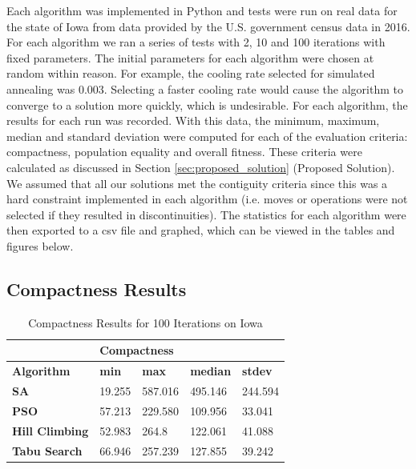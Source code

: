 \documentclass[journal]{IEEEtran}
\begin{document}
Each algorithm was implemented in Python and tests were run on real data for the state of Iowa from data provided by the U.S. government census data in 2016. For each algorithm we ran a series of tests with 2, 10 and 100 iterations with fixed parameters. The initial parameters for each algorithm were chosen at random within reason. For example, the cooling rate selected for simulated annealing was 0.003. Selecting a faster cooling rate would cause the algorithm to converge to a solution more quickly, which is undesirable.
For each algorithm, the results for each run was recorded. With this data, the minimum, maximum, median and standard deviation were computed for each of the evaluation criteria: compactness, population equality and overall fitness. These criteria were calculated as discussed in Section \ref{sec:proposed_solution} (Proposed Solution). We assumed that all our solutions met the contiguity criteria since this was a hard constraint implemented in each algorithm (i.e. moves or operations were not selected if they resulted in discontinuities). The statistics for each algorithm were then exported to a csv file and graphed, which can be viewed in the tables and figures below.

\subsection{Compactness Results}

\begin{table}[!h]
\centering
\caption{Compactness Results for 100 Iterations on Iowa}
\label{tab:comp_100iter}
\begin{tabular}{l|llll}
                       & \multicolumn{4}{l}{\textbf{Compactness}}                      \\ \hline
\textbf{Algorithm}     & \textbf{min} & \textbf{max} & \textbf{median} & \textbf{stdev} \\ \hline
\textbf{SA}            & 19.255       & 587.016      & 495.146         & 244.594       \\
\textbf{PSO}           & 57.213       & 229.580      & 109.956         & 33.041         \\
\textbf{Hill Climbing} & 52.983       & 264.8        & 122.061         & 41.088         \\
\textbf{Tabu Search}   & 66.946       & 257.239      & 127.855         & 39.242
\end{tabular}
\end{table}
\end{document}

